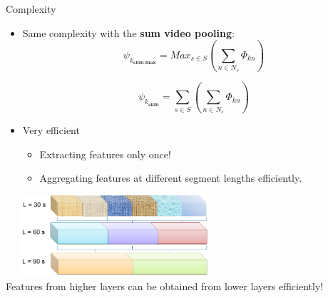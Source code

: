 \documentclass{beamer}
\begin{document}
\begin{frame}[t]{Complexity}
	
	\begin{itemize}
		\item Same complexity with the \textbf{sum video pooling}:
		\begin{equation}\psi_{k_{\textbf{sum-max}}} = Max_{s \in S}(\sum_{n \in N_{s}}\Phi_{kn})\end{equation}
		
		\begin{equation}\psi_{k_{\textbf{sum}}} = \sum_{s \in S}(\sum_{n \in N_{s}}\Phi_{kn})\end{equation}
		\item Very efficient
	 	\begin{itemize}
	 		\item Extracting features only once!
	 		\item Aggregating features at different segment lengths efficiently.
		\end{itemize}
	\end{itemize}
		\begin{center}
			\includegraphics[width=8cm,height=3cm]{images/part3/efficient.png}
			\\	\scriptsize{Features from higher layers can be obtained from lower layers efficiently!}
		\end{center}
\end{frame}
\end{document}
